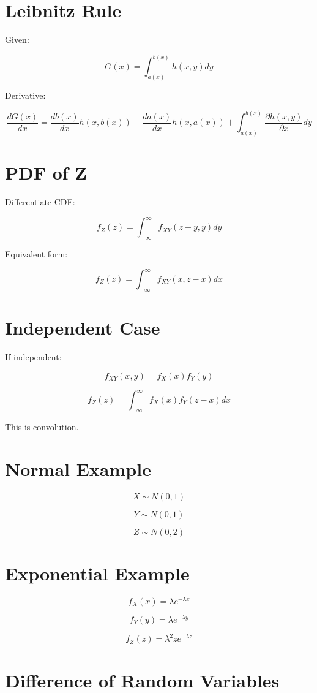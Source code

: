 \documentclass[12pt]{article}
\begin{document}
\section{Leibnitz Rule}

Given:

\[
G(x)
=
\int_{a(x)}^{b(x)}
h(x,y)
dy
\]

Derivative:

\[
\frac{dG(x)}{dx}
=
\frac{db(x)}{dx}h(x,b(x))
-
\frac{da(x)}{dx}h(x,a(x))
+
\int_{a(x)}^{b(x)}
\frac{\partial h(x,y)}{\partial x}
dy
\]

\section{PDF of Z}

Differentiate CDF:

\[
\boxed{
f_Z(z)
=
\int_{-\infty}^{\infty}
f_{XY}(z-y,y)
dy
}
\]

Equivalent form:

\[
\boxed{
f_Z(z)
=
\int_{-\infty}^{\infty}
f_{XY}(x,z-x)
dx
}
\]

\section{Independent Case}

If independent:

\[
f_{XY}(x,y)
=
f_X(x)f_Y(y)
\]

\[
\boxed{
f_Z(z)
=
\int_{-\infty}^{\infty}
f_X(x)f_Y(z-x)dx
}
\]

This is convolution.

\section{Normal Example}

\[
X \sim N(0,1)
\]

\[
Y \sim N(0,1)
\]

\[
\boxed{
Z \sim N(0,2)
}
\]

\section{Exponential Example}

\[
f_X(x) = \lambda e^{-\lambda x}
\]

\[
f_Y(y) = \lambda e^{-\lambda y}
\]

\[
\boxed{
f_Z(z)
=
\lambda^2 z e^{-\lambda z}
}
\]

\section{Difference of Random Variables}
\end{document}
